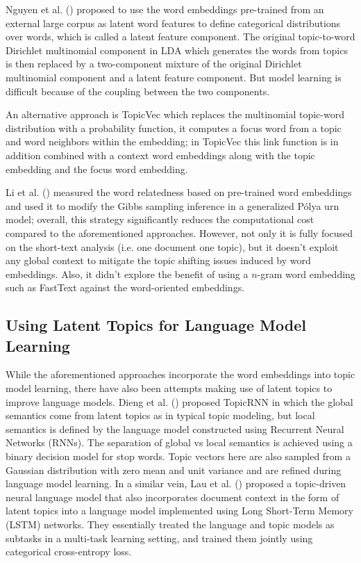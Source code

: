 \documentclass[letterpaper]{article}
\begin{document}
Nguyen et al. (\citeyear{nguyen2015improving}) proposed to use the word embeddings pre-trained from an external large corpus as latent word features to define categorical distributions over words, which is called a latent feature component. The original topic-to-word Dirichlet multinomial component in LDA which generates the words from topics is then replaced by a two-component mixture of the original Dirichlet multinomial component and a latent feature component. But model learning is difficult because of the coupling between the two components.

An alternative approach is TopicVec \cite{Li16} which replaces the multinomial topic-word distribution with a probability function, it computes a focus word from a topic and word neighbors within the embedding; in TopicVec this link function is in addition combined with a context word embeddings along with the topic embedding and the focus word embedding.

Li et al. (\citeyear{Li16SIGIR}) measured the word relatedness based on pre-trained word embeddings and used it to modify the Gibbs sampling inference in a generalized P\'{o}lya urn model; overall, this strategy significantly reduces the computational cost compared to the aforementioned approaches. However, not only it is fully focused on the short-text analysis (i.e. one document one topic), but it doesn't exploit any global context to mitigate the topic shifting issues induced by word embeddings. Also, it didn't explore the benefit of using a $n$-gram word embedding such as FastText against the word-oriented embeddings.

\subsection{Using Latent Topics for Language Model Learning}

While the aforementioned approaches incorporate the word embeddings into topic model learning, there have also been attempts making use of latent topics to improve language models. Dieng et al. (\citeyear{dieng2017topicrnn}) proposed TopicRNN in which the global semantics come from latent topics as in typical topic modeling, but local semantics is defined by the language model constructed using Recurrent Neural Networks (RNNs). The separation of global vs local semantics is achieved using a binary decision model for stop words. Topic vectors here are also sampled from a Gaussian distribution with zero mean and unit variance and are refined during language model learning. In a similar vein, Lau et al. (\citeyear{lau2017topically}) proposed a topic-driven neural language model that also incorporates document context in the form of latent topics into a language model implemented using Long Short-Term Memory (LSTM) networks. They essentially treated the language and topic models as subtasks in a multi-task learning setting, and trained them jointly using categorical cross-entropy loss.
\end{document}
